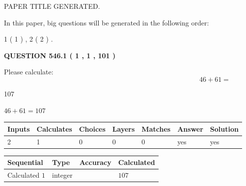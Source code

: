 \documentclass[12pt]{article}
\begin{document}
   
 PAPER TITLE GENERATED.
   
   
   
\vspace{0.2in}
   
In this paper, big questions will be generated in the following order: 
   
   
   1 ( 1 )
 ,
   2 ( 2 )
 .
  
\vspace{0.2in}
  
{\textbf{\Large{QUESTION
546.1 
 ( 1 , 1 , 101 )
}}}
  
  
 
Please calculate:
\begin{equation}
46 +  %
61 = \nonumber
\end{equation}
 
 
 
\noindent{}
 
 

107
 
 
\noindent{}
 
 

 
 
 
\noindent{}
 
 

$ %
46 +  %
61=   %
107$
 
 
\noindent{}
 
 

 
   
   
   
   
\noindent\begin{tabular}{|l|l|l|l|l|l|l|}
 \hline
Inputs & Calculates & Choices & Layers & Matches & Answer & Solution \\ \hline
 2  & 
 1  & 
 0
  & 
 0  & 
 0  & 
  yes & 
  yes 
  \\ \hline
 \end{tabular}
   
   
   
   
\noindent{}
   
   
  
  
\noindent\begin{tabular}{|l|l|l|l|}
\hline
 Sequential & Type & Accuracy & Calculated \\ 
\hline
 
 
  Calculated $  1 $ & integer &  & 
  $ 107 $ 
 \\  \hline  
 \end{tabular}
   
\end{document}
